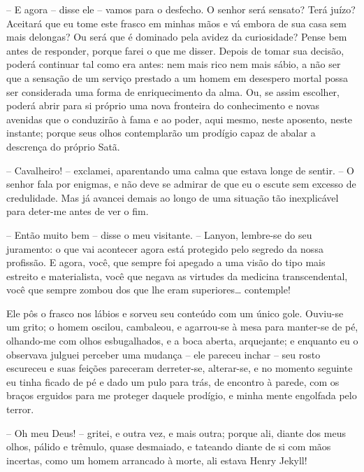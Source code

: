 -- E agora -- disse ele -- vamos para o desfecho.  O senhor será sensato?
 Terá juízo?  Aceitará que eu tome este frasco em minhas mãos e vá
embora de sua casa sem mais delongas?  Ou será que é dominado pela
avidez da curiosidade?  Pense bem antes de responder, porque farei o
que me disser.  Depois de tomar sua decisão, poderá continuar tal como
era antes: nem mais rico nem mais sábio, a não ser que a sensação de um
serviço prestado a um homem em desespero mortal possa ser considerada
uma forma de enriquecimento da alma.  Ou, se assim escolher, poderá
abrir para si próprio uma nova fronteira do conhecimento e novas
avenidas que o conduzirão à fama e ao poder, aqui mesmo, neste
aposento, neste instante; porque seus olhos contemplarão um prodígio
capaz de abalar a descrença do próprio Satã.

-- Cavalheiro! -- exclamei, aparentando uma calma que estava longe de
sentir. -- O senhor fala por enigmas, e não deve se admirar de que eu o
escute sem excesso de credulidade.  Mas já avancei demais ao longo de
uma situação tão inexplicável para deter-me antes de ver o fim.

-- Então muito bem -- disse o meu visitante. -- Lanyon, lembre-se do seu
juramento: o que vai acontecer agora está protegido pelo segredo da
nossa profissão.  E agora, você, que sempre foi apegado a uma visão do
tipo mais estreito e materialista, você que negava as virtudes da
medicina transcendental, você que sempre zombou dos que lhe eram
superiores\ldots{} contemple!

Ele pôs o frasco nos lábios e sorveu seu conteúdo com um único gole. 
Ouviu-se um grito; o homem oscilou, cambaleou, e agarrou-se à mesa para
manter-se de pé, olhando-me com olhos esbugalhados, e a boca aberta,
arquejante; e enquanto eu o observava julguei perceber uma mudança --
ele pareceu inchar -- seu rosto escureceu e suas feições pareceram
derreter-se, alterar-se, e no momento seguinte eu tinha ficado de pé e
dado um pulo para trás, de encontro à parede, com os braços erguidos
para me proteger daquele prodígio, e minha mente engolfada pelo terror.

-- Oh meu Deus! -- gritei, e outra vez, e mais outra; porque ali, diante
dos meus olhos, pálido e trêmulo, quase desmaiado, e tateando diante de
si com mãos incertas, como um homem arrancado à morte, ali estava
Henry Jekyll!  

